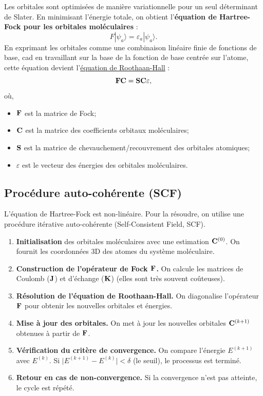 \documentclass[12pt,a4paper]{article} %
\numberwithin{equation}{section} %
\numberwithin{figure}{section} %
\numberwithin{table}{section} %
\begin{document}
Les orbitales sont optimisées de manière variationnelle pour un seul déterminant de Slater. En minimisant l'énergie totale, on obtient l'\textbf{équation de Hartree-Fock pour les orbitales moléculaires} :
\begin{equation}
F|\psi_a\rangle = \varepsilon_a|\psi_a\rangle .
\end{equation}
En exprimant les orbitales comme une combinaison linéaire finie de fonctions de base, cad en travaillant sur la base de la fonction de base centrée sur l'atome, cette équation devient l'\href{https://en.wikipedia.org/wiki/Roothaan_equations}{équation de Roothaan-Hall} :
\begin{equation}
\vb{F}\vb{C} = \vb{S}\vb{C}\varepsilon , 
\end{equation}
où,
\begin{itemize}
\item $\vb{F}$ est la matrice de Fock;
\item $\vb{C}$ est la matrice des coefficients orbitaux moléculaires;
\item $\vb{S}$ est la matrice de chevauchement/recouvrement des orbitales atomiques;
\item $\varepsilon$ est le vecteur des énergies des orbitales moléculaires.
\end{itemize}

\subsection{Procédure auto-cohérente (SCF)}

L'équation de Hartree-Fock est non-linéaire. Pour la résoudre, on utilise une procédure itérative auto-cohérente (Self-Consistent Field, SCF).

\begin{enumerate}
\item \textbf{Initialisation} des orbitales moléculaires avec une estimation $\vb{C}^{(0)}$. On fournit les coordonnées 3D des atomes du système moléculaire.
\item \textbf{Construction de l'opérateur de Fock $\vb{F}$.} On calcule les matrices de Coulomb ($\vb{J}$) et d'échange ($\vb{K}$) (elles sont très souvent coûteuses).
\item \textbf{Résolution de l'équation de Roothaan-Hall.} On diagonalise l'opérateur $\vb{F}$ pour obtenir les nouvelles orbitales et énergies.
\item \textbf{Mise à jour des orbitales.} On met à jour les nouvelles orbitales $\vb{C}^{(k+1)}$ obtenues à partir de $\vb{F}$.
\item \textbf{Vérification du critère de convergence.} On compare l'énergie $E^{(k+1)}$ avec $E^{(k)}$. Si $\big|E^{(k+1)} - E^{(k)}\big| < \delta$ (le seuil), le processus est terminé.
\item \textbf{Retour en cas de non-convergence.} Si la convergence n'est pas atteinte, le cycle est répété.
\end{enumerate}
\end{document}
